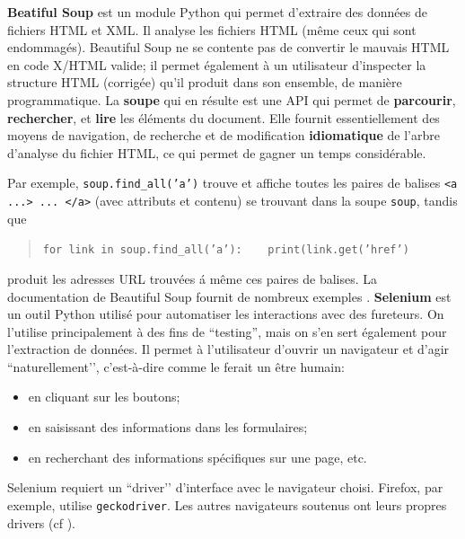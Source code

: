 \newl \textbf{Beatiful Soup} est un module Python qui permet d'extraire des données de fichiers HTML et XML. Il analyse les fichiers HTML (même ceux qui sont endommagés). Beautiful Soup ne se contente pas de convertir le mauvais HTML en code X/HTML valide; il permet \'egalement à un utilisateur d'ins\-pec\-ter la structure HTML (corrig\'ee) qu'il produit dans son ensemble, de manière programmatique. La \textbf{soupe} qui en résulte est une API qui permet de \textbf{parcourir}, \textbf{rechercher}, et \textbf{lire} les éléments du document. Elle fournit essentiellement des moyens de navigation, de recherche et de modification \textbf{idiomatique} de l'arbre d'analyse du fichier HTML, ce qui permet de gagner un temps considérable.
\par Par exemple, \texttt{soup.find\_all('a')} trouve et affiche toutes les paires de balises \texttt{<a ...> ... </a>}  (avec  attributs et contenu) se trouvant dans la soupe \texttt{soup}, tandis que \begin{quote}\texttt{for link in soup.find\_all('a'):}\newline \texttt{\ \ \ \ print(link.get('href')}
\end{quote} produit les adresses URL trouvées \'a m\^eme ces paires de balises. La documentation de Beautiful Soup fournit de nombreux exemples \cite{DC_S2}. 
\newpage\noindent\textbf{Selenium} est un outil Python utilisé pour automatiser les interactions avec des fureteurs.  On l'utilise principalement à des fins de ``testing'', mais on s’en sert également pour l'extraction de données. Il permet à l'utilisateur d'ouvrir un navigateur et d'agir ``naturellement’’, c’est-à-dire comme le ferait un être humain:
\begin{itemize}[noitemsep]
    \item en cliquant sur les boutons;
\item en saisissant des informations dans les formulaires;
\item en recherchant des informations spécifiques sur une page, etc.
\end{itemize}
Selenium requiert un ``driver’’ d'interface avec le navigateur choisi. Firefox, par exemple, utilise \texttt{geckodriver}. Les autres navigateurs soutenus ont leurs propres drivers (cf \cite{DC_S_E}).

